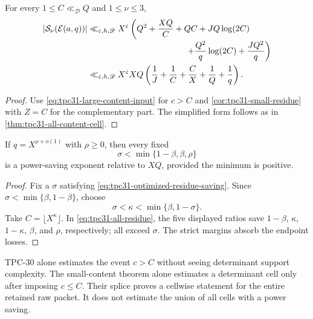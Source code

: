 \begin{theorem}
\label{thm:tpc31-all-content-residue}
For every $1\le C\ll_{\mathscr D}Q$ and $1\le\nu\le3$,
\begin{align}
 |\mathcal S_\nu(\mathcal E(a,q))|
 \ll_{\varepsilon,h,\mathscr D}{}&X^\varepsilon
 \left(
 Q^2+\frac{XQ}{C}
 +QC+JQ\log(2C)
 \right.\notag\\[-0.2em]
 &\left.\hspace{8em}
 +\frac{Q^2}q\log(2C)+\frac{JQ^2}q
 \right)
 \label{eq:tpc31-all-residue-expanded}\\
 \ll_{\varepsilon,h,\mathscr D}{}&X^\varepsilon XQ
 \left(
 \frac1J+\frac1C+\frac CX+\frac1Q+\frac1q
 \right).
 \label{eq:tpc31-all-residue}
\end{align}
\end{theorem}

\begin{proof}
Use \eqref{eq:tpc31-large-content-input} for $c>C$ and
\cref{cor:tpc31-small-residue} with $Z=C$ for the complementary
part.  The simplified form follows as in
\cref{thm:tpc31-all-content-cell}.
\end{proof}

\begin{corollary}
\label{cor:tpc31-optimized-residue}
If $q=X^{\rho+o(1)}$ with $\rho\ge0$, then every fixed
\begin{equation}
 \boxed{
 \sigma<\min\{1-\beta,\beta,\rho\}}
 \label{eq:tpc31-optimized-residue-saving}
\end{equation}
is a power-saving exponent relative to $XQ$, provided the minimum is
positive.
\end{corollary}

\begin{proof}
Fix a $\sigma$ satisfying
\eqref{eq:tpc31-optimized-residue-saving}.  Since
$\sigma<\min\{\beta,1-\beta\}$, choose
\begin{equation}
 \sigma<\kappa<\min\{\beta,1-\sigma\}.
 \label{eq:tpc31-residue-kappa-choice}
\end{equation}
Take $C=\lfloor X^\kappa\rfloor$.  In
\eqref{eq:tpc31-all-residue}, the five displayed ratios save
$1-\beta$, $\kappa$, $1-\kappa$, $\beta$, and $\rho$, respectively;
all exceed $\sigma$.  The strict margins absorb the endpoint losses.
\end{proof}

\begin{remark}
\label{rem:tpc31-splice-adds}
TPC-30 alone estimates the event $c>C$ without seeing determinant
support complexity.  The small-content theorem alone estimates a
determinant cell only after imposing $c\le C$.  Their splice proves a cellwise
statement for the entire retained raw packet.  It does not estimate
the union of all cells with a power saving.
\end{remark}
